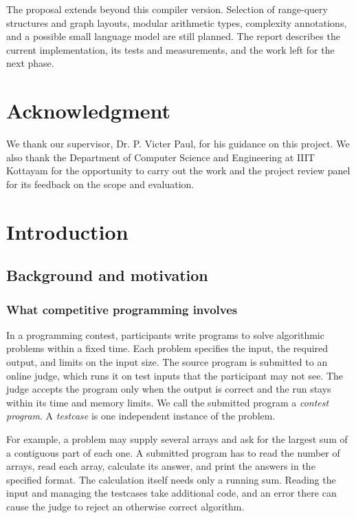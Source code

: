 \documentclass[12pt,a4paper]{report}
\begin{document}
The proposal extends beyond this compiler version. Selection of range-query structures and graph layouts, modular arithmetic types, complexity annotations, and a possible small language model are still planned. The report describes the current implementation, its tests and measurements, and the work left for the next phase.
\clearpage

\chapter*{Acknowledgment}
We thank our supervisor, Dr. P. Victer Paul, for his guidance on this project. We also thank the Department of Computer Science and Engineering at IIIT Kottayam for the opportunity to carry out the work and the project review panel for its feedback on the scope and evaluation.
\clearpage

\tableofcontents
\clearpage
\listoffigures
\clearpage
\listoftables
\clearpage
{}

\chapter{Introduction}
\section{Background and motivation}
\subsection{What competitive programming involves}
In a programming contest, participants write programs to solve algorithmic problems within a fixed time. Each problem specifies the input, the required output, and limits on the input size. The source program is submitted to an online judge, which runs it on test inputs that the participant may not see. The judge accepts the program only when the output is correct and the run stays within its time and memory limits. We call the submitted program a \emph{contest program}. A \emph{testcase} is one independent instance of the problem.

For example, a problem may supply several arrays and ask for the largest sum of a contiguous part of each one. A submitted program has to read the number of arrays, read each array, calculate its answer, and print the answers in the specified format. The calculation itself needs only a running sum. Reading the input and managing the testcases take additional code, and an error there can cause the judge to reject an otherwise correct algorithm.
\end{document}
